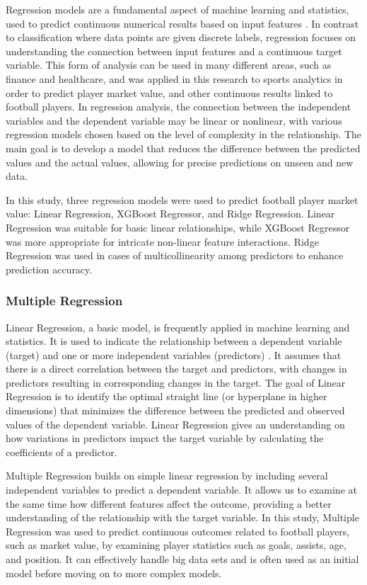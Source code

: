 \documentclass[12pt, a4paper,oneside]{book}
\numberwithin{equation}{section}
\begin{document}
Regression models are a fundamental aspect of machine learning and statistics, used to predict continuous numerical results based on input features \cite{hastie2009}. In contrast to classification where data points are given discrete labels, regression focuses on understanding the connection between input features and a continuous target variable. This form of analysis can be used in many different areas, such as finance and healthcare, and was applied in this research to sports analytics in order to predict player market value, and other continuous results linked to football players. In regression analysis, the connection between the independent variables and the dependent variable may be linear or nonlinear, with various regression models chosen based on the level of complexity in the relationship. The main goal is to develop a model that reduces the difference between the predicted values and the actual values, allowing for precise predictions on unseen and new data. 

In this study, three regression models were used to predict football player market value: Linear Regression, XGBoost Regressor, and Ridge Regression. Linear Regression was suitable for basic linear relationships, while XGBoost Regressor was more appropriate for intricate non-linear feature interactions. Ridge Regression was used in cases of multicollinearity among predictors to enhance prediction accuracy.

\subsubsection{Multiple Regression}

Linear Regression, a basic model, is frequently applied in machine learning and statistics. It is used to indicate the relationship between a dependent variable (target) and one or more independent variables (predictors) \cite{rencher2008} \cite{james2013}. It assumes that there is a direct correlation between the target and predictors, with changes in predictors resulting in corresponding changes in the target. The goal of Linear Regression is to identify the optimal straight line (or hyperplane in higher dimensions) that minimizes the difference between the predicted and observed values of the dependent variable. Linear Regression gives an understanding on how variations in predictors impact the target variable by calculating the coefficients of a predictor.

Multiple Regression builds on simple linear regression by including several independent variables \cite{chatterjee2015} \cite{montgomery2012} to predict a dependent variable. It allows us to examine at the same time how different features affect the outcome, providing a better understanding of the relationship with the target variable. In this study, Multiple Regression was used to predict continuous outcomes related to football players, such as market value, by examining player statistics such as goals, assists, age, and position. It can effectively handle big data sets and is often used as an initial model before moving on to more complex models.
\end{document}
